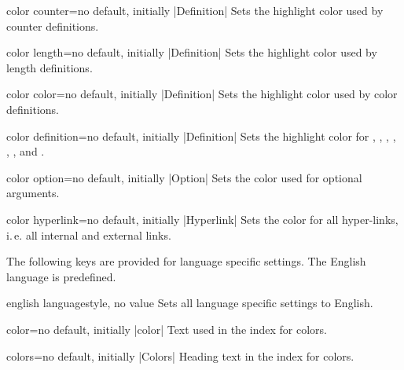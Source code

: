 \begin{docTcbKey}[][doc new={2015-01-08}]{color counter}{=}{no default, initially |Definition|}
  Sets the highlight color used by counter definitions.
\end{docTcbKey}

\begin{docTcbKey}[][doc new={2015-01-08}]{color length}{=}{no default, initially |Definition|}
  Sets the highlight color used by length definitions.
\end{docTcbKey}

\begin{docTcbKey}{color color}{=}{no default, initially |Definition|}
  Sets the highlight color used by color definitions.
\end{docTcbKey}

\begin{docTcbKey}{color definition}{=}{no default, initially |Definition|}
  Sets the highlight color for , ,
  , , ,
  , and .
\end{docTcbKey}

\begin{docTcbKey}{color option}{=}{no default, initially |Option|}
  Sets the color used for optional arguments.
\end{docTcbKey}

\begin{docTcbKey}{color hyperlink}{=}{no default, initially |Hyperlink|}
  Sets the color for all hyper-links, i.\,e. all internal and external links.
\end{docTcbKey}


\clearpage
The following keys are provided for language specific settings.
The English language is predefined.

\begin{docTcbKey}{english language}{}{style, no value}
  Sets all language specific settings to English.
\end{docTcbKey}

\begin{langTcbKey}{color}{=}{no default, initially |color|}
  Text used in the index for colors.
\end{langTcbKey}

\begin{langTcbKey}{colors}{=}{no default, initially |Colors|}
  Heading text in the index for colors.
\end{langTcbKey}

